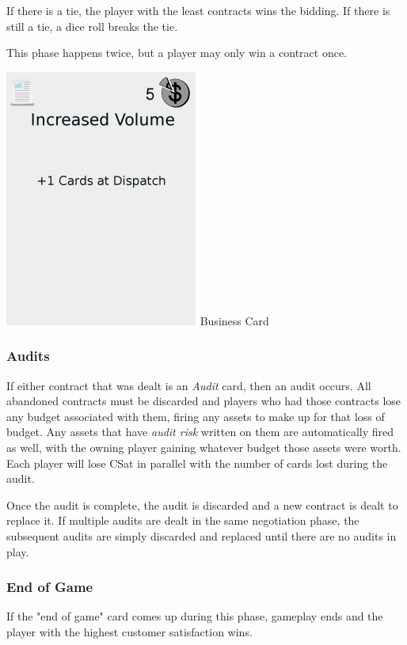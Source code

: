 \documentclass[twocolumn]{article}
\begin{document}
If there is a tie, the player with the least contracts wins the bidding. If there is still a tie, a dice roll breaks the tie.

This phase happens twice, but a player may only win a contract once. \newline

\includegraphics{business_example}
\newline
\small{Business Card}

\subsubsection*{Audits}

If either contract that was dealt is an \emph{Audit} card, then an audit occurs. All abandoned contracts must be discarded and players who had those contracts lose any budget associated with them, firing any assets to make up for that loss of budget. Any assets that have \emph{audit risk} written on them are automatically fired as well, with the owning player gaining whatever budget those assets were worth. Each player will lose CSat in parallel with the number of cards lost during the audit.

Once the audit is complete, the audit is discarded and a new contract is dealt to replace it. If multiple audits are dealt in the same negotiation phase, the subsequent audits are simply discarded and replaced until there are no audits in play.

\subsubsection*{End of Game}

If the "end of game" card comes up during this phase, gameplay ends and the player with the highest customer satisfaction wins.
\end{document}
